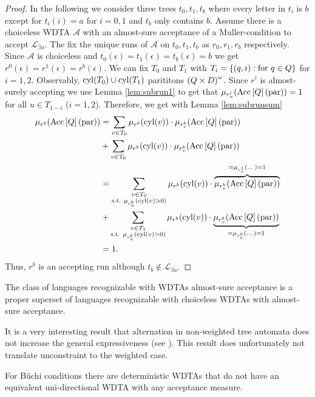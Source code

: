 \begin{proof}
  In the following we consider three trees $t_{0}, t_{1}, t_{b}$ where every 
  letter in $t_{i}$ is $b$ except for $t_{i}(i) = a$ for $i = 0,1$ and $t_{b}$ 
  only contains $b$. Assume there is a choiceless \ac{WDTA} $\mathcal{A}$ with 
  an almost-sure acceptance of a Muller-condition to accept 
  $\mathcal{L}_{\exists a}$. The fix the unique runs of $\mathcal{A}$ on 
  $t_{0},t_{1}, t_{b}$ as $r_{0}, r_{1}, r_{b}$ respectively. Since 
  $\mathcal{A}$ is choiceless and 
  $t_{0}(\epsilon) = t_{1}(\epsilon) = t_{b}(\epsilon) = b$ we get 
  $r^{0}(\epsilon) = r^{1}(\epsilon) = r^{b}(\epsilon)$. We can fix
  $T_{0}$ and $T_{1}$ with $T_{i} = \left\{\left(q, i\right):\text{for }q\in Q\right\}$ 
  for $i = 1,2$. Observably, $\operatorname{cyl}(T_{0})\cup\operatorname{cyl}(T_{1})$ parititons 
  $\left(Q\times D\right)^{\omega}$. Since $r^{i}$ is almost-surely accepting we use
  Lemma \ref{lem:subrun1} to get that 
  $\mu_{r^{i}_{u}}(\operatorname{Acc}\left[Q\right](\operatorname{par})) = 1$ for all $u\in T_{1-i}$ 
  ($i = 1,2$). Therefore, we get with Lemma \ref{lem:subrunsum}
  \begin{align*}
    \mu_{r^{b}}(\operatorname{Acc}\left[Q\right](\operatorname{par})) &= \sum_{v\in T_{0}}
      \mu_{r^{b}}(\operatorname{cyl}(v))\cdot\mu_{r^{b}_{v}}(\operatorname{Acc}\left[Q\right](\operatorname{par}))\\
    &+ \sum_{v\in T_{0}}
      \mu_{r^{b}}(\operatorname{cyl}(v))\cdot\mu_{r^{b}_{v}}(\operatorname{Acc}\left[Q\right](\operatorname{par}))\\
    &= \sum_{\substack{v\in T_{0}\\\text{s.t. }\mu_{r^{b}_{u}}(\operatorname{cyl}(v)>0)}}
      \mu_{r^{b}}(\operatorname{cyl}(v))\cdot\overbrace{\mu_{r^{b}_{v}}(
        \operatorname{Acc}\left[Q\right](\operatorname{par}))}^{=\mu_{r^{1}_{v}}(\dots)=1}\\
    &+ \sum_{\substack{v\in T_{1}\\\text{s.t. }\mu_{r^{b}_{u}}(\operatorname{cyl}(v)>0)}}
      \mu_{r^{b}}(\operatorname{cyl}(v))\cdot\underbrace{\mu_{r^{b}_{v}}(
        \operatorname{Acc}\left[Q\right](\operatorname{par}))}_{=\mu_{r^{0}_{v}}(\dots)=1}\\
    &= 1.
  \end{align*}
  Thus, $r^{b}$ is an accepting run although 
  $t_{b}\notin\mathcal{L}_{\exists a}$.
\end{proof}

\begin{proposition}
  The class of languages recognizable with \acp{WDTA} almost-sure acceptance
  is a proper superset of languages recognizable with choiceless \acp{WDTA}
  with almost-sure acceptance.
\end{proposition}

It is a very interesting result that alternation in non-weighted tree automata
does not increase the general expressiveness (see \cite{SimAltTreeAuto}).
This result does unfortunately not translate unconstraint to the weighted case.


\begin{corollary}
  For Büchi conditions there are deterministic \acp{WDTA} that do not have an
  equivalent uni-directional \ac{WDTA} with any acceptance measure.
\end{corollary}
